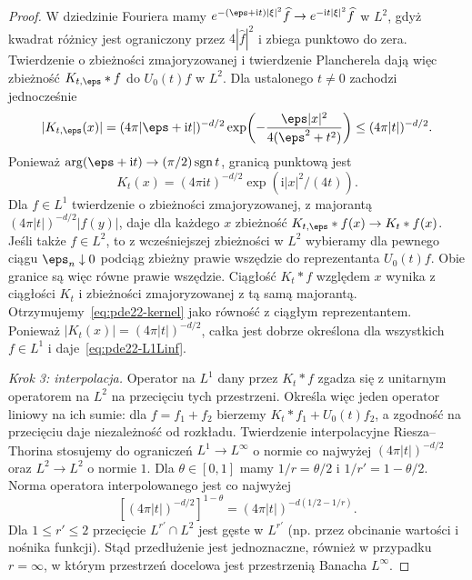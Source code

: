 \begin{proof}
W dziedzinie Fouriera mamy
$e^{-(\eps+\mathrm it)|\xi|^2}\widehat f\to
e^{-\mathrm it|\xi|^2}\widehat f$ w $L^2$,
gdyż kwadrat różnicy jest ograniczony przez
$4|\widehat f|^2$ i zbiega punktowo do zera.
Twierdzenie o zbieżności zmajoryzowanej i twierdzenie
Plancherela dają więc zbieżność $K_{t,\eps}*f$
do $U_0(t)f$ w $L^2$.
Dla ustalonego $t\ne0$ zachodzi jednocześnie
\[
 |K_{t,\eps}(x)|
 =(4\pi|\eps+\mathrm it|)^{-d/2}
  \exp\!\left(-\frac{\eps|x|^2}{4(\eps^2+t^2)}\right)
 \le(4\pi|t|)^{-d/2}.
\]
Ponieważ $\arg(\eps+\mathrm it)\to
(\pi/2)\operatorname{sgn}t$, granicą punktową jest
\[
 K_t(x)=(4\pi\mathrm it)^{-d/2}
          \exp(\mathrm i|x|^2/(4t)).
\]
Dla $f\in L^1$ twierdzenie o zbieżności
zmajoryzowanej, z majorantą
$(4\pi|t|)^{-d/2}|f(y)|$, daje dla każdego $x$
zbieżność $K_{t,\eps}*f(x)\to K_t*f(x)$.
Jeśli także $f\in L^2$, to z wcześniejszej
zbieżności w $L^2$ wybieramy dla pewnego
ciągu $\eps_n\downarrow0$ podciąg zbieżny
prawie wszędzie do reprezentanta $U_0(t)f$.
Obie granice są więc równe prawie wszędzie.
Ciągłość $K_t*f$ względem $x$ wynika z ciągłości
$K_t$ i zbieżności zmajoryzowanej z tą samą
majorantą. Otrzymujemy~\eqref{eq:pde22-kernel}
jako równość z ciągłym reprezentantem.
Ponieważ $|K_t(x)|=(4\pi|t|)^{-d/2}$, całka
jest dobrze określona dla wszystkich $f\in L^1$
i daje~\eqref{eq:pde22-L1Linf}.

\emph{Krok 3: interpolacja.}
Operator na $L^1$ dany przez $K_t*f$ zgadza się
z unitarnym operatorem na $L^2$ na przecięciu
tych przestrzeni. Określa więc jeden operator
liniowy na ich sumie: dla $f=f_1+f_2$ bierzemy
$K_t*f_1+U_0(t)f_2$, a zgodność na przecięciu
daje niezależność od rozkładu.
Twierdzenie interpolacyjne Riesza--Thorina
stosujemy do ograniczeń $L^1\to L^\infty$
o normie co najwyżej $(4\pi|t|)^{-d/2}$
oraz $L^2\to L^2$ o normie $1$.
Dla $\theta\in[0,1]$ mamy
$1/r=\theta/2$ i $1/r'=1-\theta/2$.
Norma operatora interpolowanego jest co najwyżej
\[
 [(4\pi|t|)^{-d/2}]^{1-\theta}
 =(4\pi|t|)^{-d(1/2-1/r)}.
\]
Dla $1\le r'\le2$ przecięcie $L^{r'}\cap L^2$
jest gęste w $L^{r'}$ (np. przez obcinanie
wartości i nośnika funkcji). Stąd przedłużenie
jest jednoznaczne, również w przypadku $r=\infty$,
w którym przestrzeń docelowa jest przestrzenią
Banacha $L^\infty$.
\end{proof}

